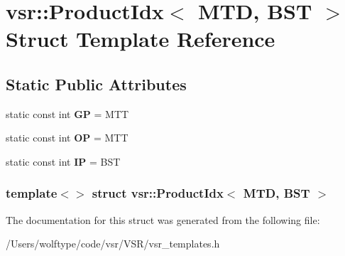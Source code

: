 \hypertarget{structvsr_1_1_product_idx_3_01_m_t_d_00_01_b_s_t_01_4}{\section{vsr\-:\-:Product\-Idx$<$ M\-T\-D, B\-S\-T $>$ Struct Template Reference}
\label{structvsr_1_1_product_idx_3_01_m_t_d_00_01_b_s_t_01_4}
}
\subsection*{Static Public Attributes}
\begin{DoxyCompactItemize}
\item 
\hypertarget{structvsr_1_1_product_idx_3_01_m_t_d_00_01_b_s_t_01_4_a87e22e3d60642b7b5ec06ce4a7f4423e}{static const int {\bfseries G\-P} = M\-T\-T}\label{structvsr_1_1_product_idx_3_01_m_t_d_00_01_b_s_t_01_4_a87e22e3d60642b7b5ec06ce4a7f4423e}

\item 
\hypertarget{structvsr_1_1_product_idx_3_01_m_t_d_00_01_b_s_t_01_4_a976a28790b8bd1141998f1178bdced24}{static const int {\bfseries O\-P} = M\-T\-T}\label{structvsr_1_1_product_idx_3_01_m_t_d_00_01_b_s_t_01_4_a976a28790b8bd1141998f1178bdced24}

\item 
\hypertarget{structvsr_1_1_product_idx_3_01_m_t_d_00_01_b_s_t_01_4_a2b355313af607e2806e5a54e05546681}{static const int {\bfseries I\-P} = B\-S\-T}\label{structvsr_1_1_product_idx_3_01_m_t_d_00_01_b_s_t_01_4_a2b355313af607e2806e5a54e05546681}

\end{DoxyCompactItemize}
\subsubsection*{template$<$$>$ struct vsr\-::\-Product\-Idx$<$ M\-T\-D, B\-S\-T $>$}



The documentation for this struct was generated from the following file\-:\begin{DoxyCompactItemize}
\item 
/\-Users/wolftype/code/vsr/\-V\-S\-R/vsr\-\_\-templates.\-h\end{DoxyCompactItemize}
